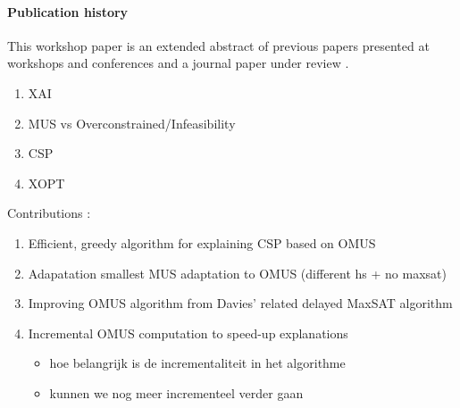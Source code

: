 {{\paragraph*{Publication history} This workshop paper is an extended abstract of previous papers presented at workshops and conferences \cite{claesuser,DBLP:conf/bnaic/ClaesBCGG19,ecai/BogaertsGCG20} and a journal paper under review \cite{bogaerts2020framework}.
}

\begin{enumerate}
    \item XAI
    \item MUS vs Overconstrained/Infeasibility
    \item CSP
    \item XOPT
\end{enumerate}

Contributions : 
\begin{enumerate}
    \item Efficient, greedy algorithm for explaining CSP based on OMUS 
    \item Adapatation smallest MUS adaptation to OMUS (different hs + no maxsat) 
    \item Improving OMUS algorithm from Davies' related delayed MaxSAT algorithm 
    \item Incremental OMUS computation to speed-up explanations
    \begin{itemize}
        \item hoe belangrijk is de incrementaliteit in het algorithme
        \item kunnen  we nog meer incrementeel verder gaan
    \end{itemize}
\end{enumerate}
}


